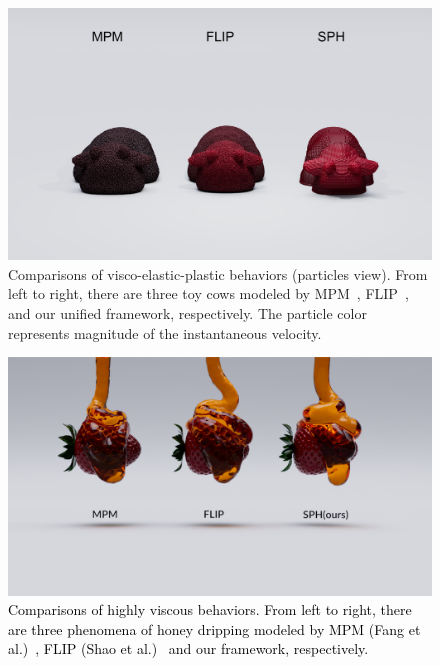 \documentclass[10pt,journal,compsoc]{IEEEtran}
\newcommand{\revised}[1]{{\textcolor{black}{#1}}}
\begin{document}
\begin{figure}[htbp]
	\centering
	\includegraphics[width=0.9\linewidth]{pics/cow-new.png}
	\caption{Comparisons of visco-elastic-plastic behaviors (particles view). From left to right, there are three toy cows modeled by MPM~\cite{Fang2019-sillyRubber}, FLIP~\cite{Shao-Huang2022-unsmoothed}, and our unified framework, respectively. The particle color represents magnitude of the instantaneous velocity.}      \label{fig:cow1}
\end{figure}

\begin{figure}[htbp]
	\centering
	\includegraphics[width=0.9\linewidth]{pics/honey_comp.png}
	\caption{\revised{Comparisons of highly viscous behaviors. From left to right, there are three phenomena of honey dripping modeled by MPM (Fang et al.)~\cite{Fang2019-sillyRubber}, FLIP (Shao et al.)~\cite{Shao-Huang2022-unsmoothed} and our framework, respectively.}}     \label{fig:honey_comp1}
\end{figure}
\end{document}
